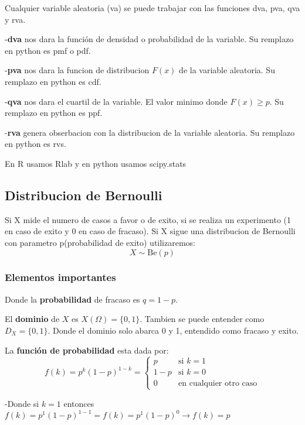 \documentclass[
]{article}
\begin{document}
Cualquier variable aleatoria (va) se puede trabajar con las funciones
dva, pva, qva y rva.

-\textbf{dva} nos dara la función de densidad o probabilidad de la
variable. Su remplazo en python es pmf o pdf.

-\textbf{pva} nos dara la funcion de distribucion \(F(x)\) de la
variable aleatoria. Su remplazo en python es cdf.

-\textbf{qva} nos dara el cuartil de la variable. El valor minimo donde
\(F(x)\geq p\). Su remplazo en python es ppf.

-\textbf{rva} genera obserbacion con la distribucion de la variable
aleatoria. Su remplazo en python es rvs.

En R usamos Rlab y en python usamos scipy.stats

\hypertarget{distribucion-de-bernoulli}{%
\subsection{Distribucion de Bernoulli}\label{distribucion-de-bernoulli}}

Si X mide el numero de casos a favor o de exito, si se realiza un
experimento (1 en caso de exito y 0 en caso de fracaso). Si X sigue una
distribucion de Bernoulli con parametro p(probabilidad de exito)
utilizaremos: \[X\sim \text{Be}(p) \]

\hypertarget{elementos-importantes}{%
\subsubsection{Elementos importantes}\label{elementos-importantes}}

Donde la \textbf{probabilidad} de fracaso es \(q=1-p\).

El \textbf{dominio} de \(X\) es \(X(\Omega)=\{0,1\}\). Tambien se puede
entender como \(D_X = \{0,1\}\). Donde el dominio solo abarca 0 y 1,
entendido como fracaso y exito.

La \textbf{función de probabilidad} esta dada por:
\[f(k)=p^k(1-p)^{1-k}= \left\{
\begin{array}{rl}
     p & \text{si } k=1 
  \\ 1-p & \text{si } k=0
  \\ 0 & \text{en cualquier otro caso}
\end{array}
\right.\]

-Donde si \(k=1\) entonces
\(f(k)=p^1(1-p)^{1-1}=f(k)=p^1(1-p)^{0}\longrightarrow f(k)=p\)
\end{document}
